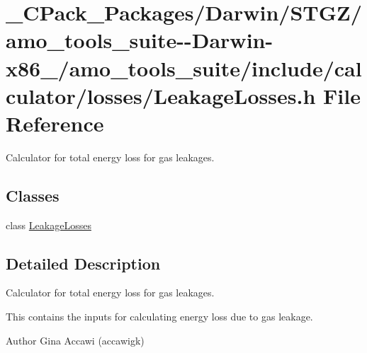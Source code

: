 \hypertarget{___c_pack___packages_2_darwin_2_s_t_g_z_2amo__tools__suite--_darwin-x86__64_2amo__tools__suite_2eff36906b0118b933544333840dbb6dd}{}\section{\+\_\+\+C\+Pack\+\_\+\+Packages/\+Darwin/\+S\+T\+G\+Z/amo\+\_\+tools\+\_\+suite-\/-\/\+Darwin-\/x86\+\_/amo\+\_\+tools\+\_\+suite/include/calculator/losses/\+Leakage\+Losses.h File Reference}
\label{___c_pack___packages_2_darwin_2_s_t_g_z_2amo__tools__suite--_darwin-x86__64_2amo__tools__suite_2eff36906b0118b933544333840dbb6dd}


Calculator for total energy loss for gas leakages.  


\subsection*{Classes}
\begin{DoxyCompactItemize}
\item 
class \hyperlink{class_leakage_losses}{Leakage\+Losses}
\end{DoxyCompactItemize}


\subsection{Detailed Description}
Calculator for total energy loss for gas leakages. 

This contains the inputs for calculating energy loss due to gas leakage.

\begin{DoxyAuthor}{Author}
Gina Accawi (accawigk) 
\end{DoxyAuthor}
